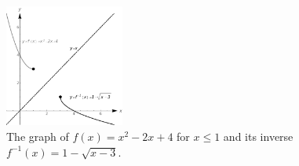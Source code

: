 \begin{example}
%
%
%
%
%
%
%



\begin{figure}[H]
	\begin{center}
			\includegraphics[width=0.35\textwidth]{fig_functions_41}
	\caption{The graph of $f(x) = x^2-2x+4$ for $x \leq 1$ and its inverse $f^{-1}(x)=1 -\sqrt{x-3}$.}
	\label{fig_functions_41}
	\end{center}
\end{figure}


\end{example}


